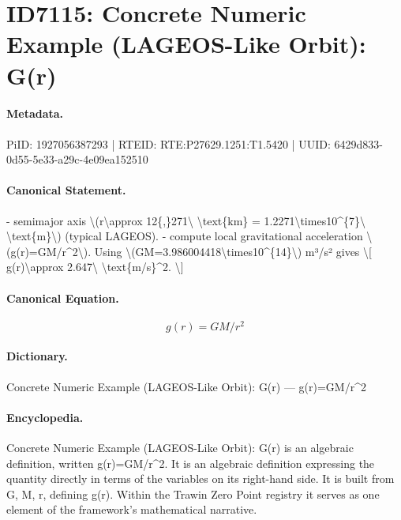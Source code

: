 \section*{ID7115: Concrete Numeric Example (LAGEOS-Like Orbit): G(r)}
\paragraph{Metadata.}
PiID: 1927056387293 | RTEID: RTE:P27629.1251:T1.5420 | UUID: 6429d833-0d55-5e33-a29c-4e09ea152510

\paragraph{Canonical Statement.}
- semimajor axis \textbackslash{}(r\textbackslash{}approx 12\{,\}271\textbackslash{} \textbackslash{}text\{km\} = 1.2271\textbackslash{}times10\textasciicircum{}\{7\}\textbackslash{} \textbackslash{}text\{m\}\textbackslash{}) (typical LAGEOS). - compute local gravitational acceleration \textbackslash{}(g(r)=GM/r\textasciicircum{}2\textbackslash{}). Using \textbackslash{}(GM=3.986004418\textbackslash{}times10\textasciicircum{}\{14\}\textbackslash{}) m³/s² gives \textbackslash{}[ g(r)\textbackslash{}approx 2.647\textbackslash{} \textbackslash{}text\{m/s\}\textasciicircum{}2. \textbackslash{}]

\paragraph{Canonical Equation.}
\[
g(r)=GM/r^2
\]

\paragraph{Dictionary.}
Concrete Numeric Example (LAGEOS-Like Orbit): G(r) — g(r)=GM/r\textasciicircum{}2

\paragraph{Encyclopedia.}
Concrete Numeric Example (LAGEOS-Like Orbit): G(r) is an algebraic definition, written g(r)=GM/r\textasciicircum{}2. It is an algebraic definition expressing the quantity directly in terms of the variables on its right-hand side. It is built from G, M, r, defining g(r). Within the Trawin Zero Point registry it serves as one element of the framework's mathematical narrative.
